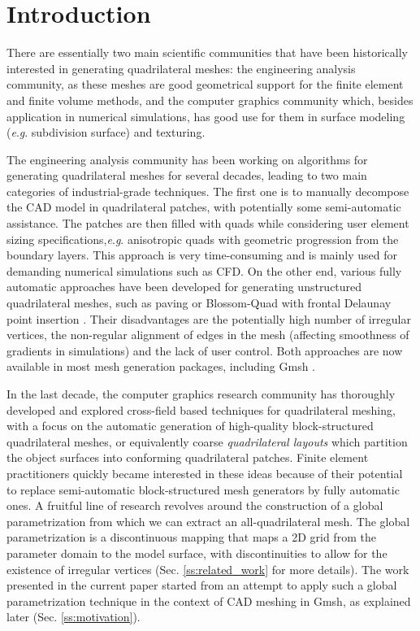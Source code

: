 \documentclass[AMA,STIX1COL]{WileyNJD-v2}
\newcommand{\eg}{\textit{e}.\textit{g}. }
\newcommand\rsec[1]{Sec. \ref{#1}}
\begin{document}
{\section{Introduction}

There are essentially two main scientific communities that have been
historically interested in generating quadrilateral meshes: the engineering
analysis community, as these meshes are good geometrical support for the finite
element and finite volume methods, and the computer graphics community 
which, besides application in numerical simulations, has good use for them 
in surface modeling (\eg subdivision surface) and texturing.

The engineering analysis community has been working on algorithms for
generating quadrilateral meshes for several decades, leading to two main
categories of industrial-grade techniques. The first one is to manually
decompose the CAD model in quadrilateral patches, with potentially some
semi-automatic assistance.  The patches are then filled with quads while
considering user element sizing specifications,\eg anisotropic quads with
geometric progression from the boundary layers. This approach is very time-consuming
and is mainly used
for demanding numerical simulations such as CFD. On the other end, various
fully automatic approaches have been developed for generating unstructured
quadrilateral meshes, such as paving \cite{blacker1991} or Blossom-Quad
\cite{blossom} with frontal Delaunay point insertion \cite{delquad}. Their
disadvantages are the potentially high number of irregular vertices, the
non-regular alignment of edges in the mesh (affecting smoothness of gradients
in simulations) and the lack of user control. Both approaches
are now available in most mesh generation packages, including Gmsh \cite{gmsh2009}. 

In the last decade, the computer graphics research community has thoroughly
developed and explored cross-field based techniques for quadrilateral meshing,
with a focus on the automatic generation of high-quality block-structured
quadrilateral meshes, or equivalently coarse \emph{quadrilateral layouts} which
partition the object surfaces into conforming quadrilateral patches.
Finite element practitioners quickly became interested in these
ideas because of their potential to replace semi-automatic block-structured
mesh generators by fully automatic ones. A fruitful line of research revolves
around the construction of a global parametrization from which we can extract
an all-quadrilateral mesh. The global parametrization is a discontinuous mapping
that maps a 2D grid from the parameter domain to the model surface, with
discontinuities to allow for the existence of irregular vertices 
(\rsec{ss:related_work} for more details). The work
presented in the current paper started from an attempt to apply such a global
parametrization technique in the context of CAD meshing in Gmsh, as explained
later (\rsec{ss:motivation}).


}
\end{document}
